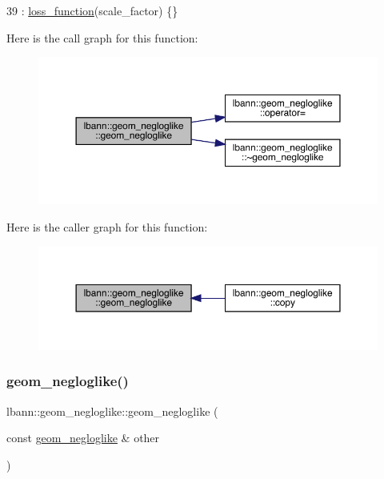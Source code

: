 \begin{DoxyCode}
39     : \hyperlink{classlbann_1_1loss__function_a0c5745e661c59e3e5496888d233c07cf}{loss\_function}(scale\_factor) \{\}
\end{DoxyCode}
Here is the call graph for this function\+:\nopagebreak
\begin{figure}[H]
\begin{center}
\leavevmode
\includegraphics[width=350pt]{classlbann_1_1geom__negloglike_a2cd89175b2c6ec556b9697aa75d6068e_cgraph}
\end{center}
\end{figure}
Here is the caller graph for this function\+:\nopagebreak
\begin{figure}[H]
\begin{center}
\leavevmode
\includegraphics[width=350pt]{classlbann_1_1geom__negloglike_a2cd89175b2c6ec556b9697aa75d6068e_icgraph}
\end{center}
\end{figure}
\mbox{\label{classlbann_1_1geom__negloglike_ada3ee13998f96d7cbf16f8605194b96f}} 
\subsubsection{\texorpdfstring{geom\+\_\+negloglike()}{geom\_negloglike()}\hspace{0.1cm}{\footnotesize\ttfamily [2/2]}}
{\footnotesize\ttfamily lbann\+::geom\+\_\+negloglike\+::geom\+\_\+negloglike (\begin{DoxyParamCaption}\item[{const \hyperlink{classlbann_1_1geom__negloglike}{geom\+\_\+negloglike} \&}]{other }\end{DoxyParamCaption})\hspace{0.3cm}{\ttfamily [default]}}

